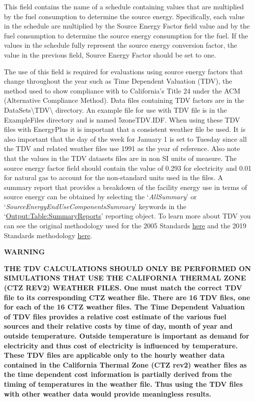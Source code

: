 This field contains the name of a schedule containing values that are multiplied by the fuel consumption to determine the source energy. Specifically, each value in the schedule are multiplied by the Source Energy Factor field value and by the fuel consumption to determine the source energy consumption for the fuel. If the values in the schedule fully represent the source energy conversion factor, the value in the previous field, Source Energy Factor should be set to one.

The use of this field is required for evaluations using source energy factors that change throughout the year such as Time Dependent Valuation (TDV), the method used to show compliance with to California's Title 24 under the ACM (Alternative Compliance Method). Data files containing TDV factors are in the DataSets\textbackslash{}TDV\textbackslash{} directory. An example file for use with TDV file is in the ExampleFiles directory and is named 5zoneTDV.IDF. When using these TDV files with EnergyPlus it is important that a consistent weather file be used. It is also important that the day of the week for January 1 is set to Tuesday since all the TDV and related weather files use 1991 as the year of reference. Also note that the values in the TDV datasets files are in non SI units of measure. The source energy factor field should contain the value of 0.293 for electricity and 0.01 for natural gas to account for the non-standard units used in the files. A summary report that provides a breakdown of the facility energy use in terms of source energy can be obtained by selecting the `\emph{AllSummary}' or `\emph{SourceEnergyEndUseComponentsSummary}' keywords in the `\hyperref[outputtablesummaryreports]{Output:Table:SummaryReports}' reporting object. To learn more about TDV you can see the original methodology used for the 2005 Standards \href{http://h-m-g.com/TDV/}{here} and the 2019 Standards methodology \href{https://www.ethree.com/wp-content/uploads/2017/01/TN212524_20160801T120224_2019_TDV_Methodology_Report_7222016.pdf}{here}.

\textbf{WARNING}

\textbf{THE TDV CALCULATIONS SHOULD ONLY BE PERFORMED ON SIMULATIONS THAT USE THE CALIFORNIA THERMAL ZONE (CTZ REV2) WEATHER FILES. One must match the correct TDV file to its corresponding CTZ weather file. There are 16 TDV files, one for each of the 16 CTZ weather files. The Time Dependent Valuation of TDV files provides a relative cost estimate of the various fuel sources and their relative costs by time of day, month of year and outside temperature. Outside temperature is important as demand for electricity and thus cost of electricity is influenced by temperature. These TDV files are applicable only to the hourly weather data contained in the California Thermal Zone (CTZ rev2) weather files as the time dependent cost information is partially derived from the timing of temperatures in the weather file. Thus using the TDV files with other weather data would provide meaningless results.}

